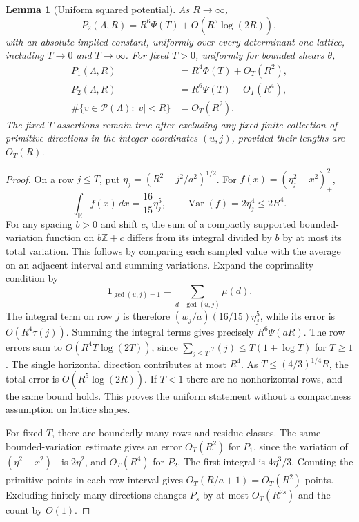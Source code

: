 \documentclass[11pt]{article}
\newtheorem{lemma}[theorem]{Lemma}
\theoremstyle{remark}\newtheorem{remark}[theorem]{Remark}
\newcommand{\Z}{\mathbb Z}\newcommand{\R}{\mathbb R}\newcommand{\N}{\mathbb N}
\newcommand{\PP}{\mathcal P}\newcommand{\tr}{\operatorname{tr}}
\begin{document}
\begin{lemma}[Uniform squared potential]\label{lem:uniform}
As $R\to\infty$,
\[
 P_2(\Lambda,R)=R^6\Psi(T)+O(R^5\log(2R)),
\]
with an absolute implied constant, uniformly over every determinant-one lattice, including $T\to0$ and $T\to\infty$.
For fixed $T>0$, uniformly for bounded shears $\theta$,
\begin{align*}
 P_1(\Lambda,R)&=R^4\Phi(T)+O_T(R^2),\\
 P_2(\Lambda,R)&=R^6\Psi(T)+O_T(R^4),\\
 \#\{v\in\PP(\Lambda):|v|<R\}&=O_T(R^2).
\end{align*}
The fixed-$T$ assertions remain true after excluding any fixed finite collection of primitive directions in the integer coordinates $(u,j)$, provided their lengths are $O_T(R)$.
\end{lemma}
\begin{proof}
On a row $j\le T$, put $\eta_j=(R^2-j^2/a^2)^{1/2}$. For $f(x)=(\eta_j^2-x^2)_+^2$,
\[
 \int_\R f(x)\,dx=\frac{16}{15}\eta_j^5,
 \qquad \operatorname{Var}(f)=2\eta_j^4\le2R^4.
\]
For any spacing $b>0$ and shift $c$, the sum of a compactly supported bounded-variation function on $b\Z+c$ differs from its integral divided by $b$ by at most its total variation. This follows by comparing each sampled value with the average on an adjacent interval and summing variations. Expand the coprimality condition by
\[
 \mathbf1_{\gcd(u,j)=1}=\sum_{d\mid\gcd(u,j)}\mu(d).
\]
The integral term on row $j$ is therefore $(w_j/a)(16/15)\eta_j^5$, while its error is $O(R^4\tau(j))$. Summing the integral terms gives precisely $R^6\Psi(aR)$. The row errors sum to $O(R^4T\log(2T))$, since $\sum_{j\le T}\tau(j)\le T(1+\log T)$ for $T\ge1$. The single horizontal direction contributes at most $R^4$. As $T\le(4/3)^{1/4}R$, the total error is $O(R^5\log(2R))$. If $T<1$ there are no nonhorizontal rows, and the same bound holds. This proves the uniform statement without a compactness assumption on lattice shapes.

For fixed $T$, there are boundedly many rows and residue classes. The same bounded-variation estimate gives an error $O_T(R^2)$ for $P_1$, since the variation of $(\eta^2-x^2)_+$ is $2\eta^2$, and $O_T(R^4)$ for $P_2$. The first integral is $4\eta^3/3$. Counting the primitive points in each row interval gives $O_T(R/a+1)=O_T(R^2)$ points. Excluding finitely many directions changes $P_s$ by at most $O_T(R^{2s})$ and the count by $O(1)$.
\end{proof}
\end{document}
